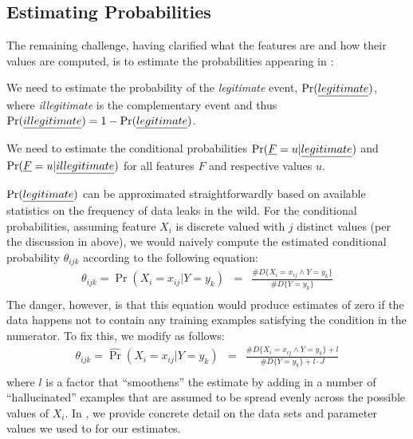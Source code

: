 \subsection{Estimating Probabilities}\label{Se:estprob}

The remaining challenge, having clarified what the features are and how their values are computed, is to estimate the probabilities appearing in :
\begin{compactitem}
	\item We need to estimate the probability of the \emph{legitimate} event, $\Pr(\emph{legitimate})$, where \emph{illegitimate} is the complementary event and thus 
	$\Pr(\emph{illegitimate}) = 1 - \Pr(\emph{legitimate})$.
	\item We need to estimate the conditional probabilities $\Pr(\emph{F} = u | \emph{legitimate})$ and $\Pr(\emph{F} = u | \emph{illegitimate})$ for all features $F$
	and respective values $u$.
\end{compactitem}

$\Pr(\emph{legitimate})$ can be approximated straightforwardly based on available statistics on the frequency of data leaks in the wild. For the conditional probabilities, assuming feature $X_i$ is discrete valued with $j$ distinct values (per the discussion in  above), we would naively compute the 
estimated conditional probability $\theta_{ijk}$ according to the following equation: 
\begin{equation}\label{Eq:naiveEstimate}
	\begin{array}{lcr}
		\theta_{ijk} = \hat{\Pr}(X_i = x_{ij} | Y=y_k) & = & \frac{\# D \{ X_i = x_{ij} \wedge Y = y_k \}}{\# D \{ Y = y_k \}} \\ 
	\end{array}
\end{equation}
The danger, however, is that this equation would produce estimates of zero if the data happens not to contain any training examples satisfying the condition in the numerator. To fix this, we modify  as follows:
\begin{equation}\label{Eq:smoothEstimate}
	\begin{array}{lcr}
		\theta_{ijk} = \hat{\Pr}(X_i = x_{ij} | Y=y_k) & = & \frac{\# D \{ X_i = x_{ij} \wedge Y = y_k \} + l}{\# D \{ Y = y_k \} + l \cdot J} \\ 
	\end{array}
\end{equation}
where $l$ is a factor that ``smoothens'' the estimate by adding in a number of ``hallucinated'' examples that are assumed to be spread evenly across the possible values of $X_i$. In , we provide concrete detail on the data sets and parameter values we used to for our estimates.


